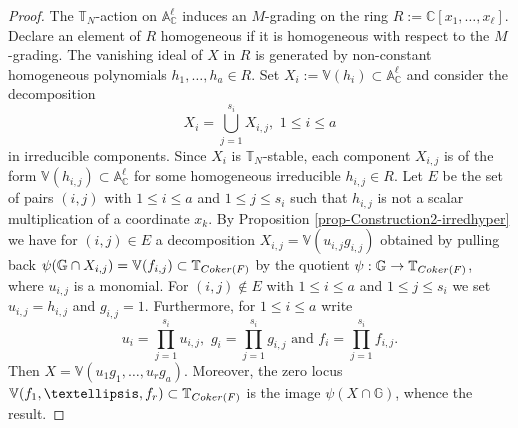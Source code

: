 \documentclass[10pt,a4paper]{amsart}
\begin{document}
\begin{proof}
The $\mathbb{T}_{N}$-action on $\mathbb{A}^{\ell}_{\mathbb{C}}$ induces an $M$-grading on the ring $R:= \mathbb{C}[x_{1}, \ldots, x_{\ell}]$. Declare an element of $R$ homogeneous if it is homogeneous with respect to the $M$-grading.
The vanishing ideal of $X$ in $R$ is generated by non-constant homogeneous polynomials $h_{1}, \ldots, h_{a}\in R$. Set $X_{i}:= \mathbb{V}(h_{i})\subset \mathbb{A}^{\ell}_{\mathbb{C}}$ and consider the decomposition
$$ X_{i} =  \bigcup_{j =  1}^{s_{i}}X_{i, j}, \,\, 1\leq i\leq a$$
in irreducible components. Since $X_{i}$ is $\mathbb{T}_{N}$-stable, each component $X_{i, j}$ is of the form $\mathbb{V}(h_{i, j})\subset \mathbb{A}^{\ell}_{\mathbb{C}}$ for some homogeneous irreducible $h_{i, j}\in R$. Let $E$ be the set of pairs $(i, j)$ with $1\leq i\leq a$ and $1\leq j\leq s_{i}$
such that $h_{i, j}$ is not a scalar multiplication of a coordinate $x_{k}$. By 
Proposition \ref{prop-Construction2-irredhyper} we have  for $(i, j)\in E$ a decomposition $X_{i, j}  =  \mathbb{V}(u_{i, j} g_{i, j})$
obtained by pulling back $\psi(\mathbb{G}\cap X_{i, j}) = \mathbb{V}(f_{i, j})\subset \mathbb{T}_{{\rm Coker}(F)}$ by the quotient $\psi: \mathbb{G}\rightarrow \mathbb{T}_{{\rm Coker}(F)}$, where $u_{i, j}$ is a monomial. 
For $(i, j)\not\in E$ with $1\leq i\leq a$ and $1\leq j\leq s_{i}$ we set $u_{i, j} =  h_{i, j}$ and $g_{i, j} =  1$. Furthermore, for $1\leq i\leq a$
write 
$$ u_{i} =  \prod_{j = 1}^{s_{i}} u_{i, j},\,\, g_{i} =  \prod_{j =  1}^{s_{i}}g_{i, j} \text{ and }f_{i}  =  \prod_{j =  1}^{s_{i}}f_{i, j}.$$
Then $X  =  \mathbb{V}(u_{1}g_{1}, \ldots, u_{r}g_{a})$. Moreover, the zero locus $\mathbb{V}(f_{1}, \ldots, f_{r})\subset \mathbb{T}_{{\rm Coker}(F)}$ is the image $\psi(X\cap \mathbb{G})$, whence the result. 
\end{proof}
\end{document}
